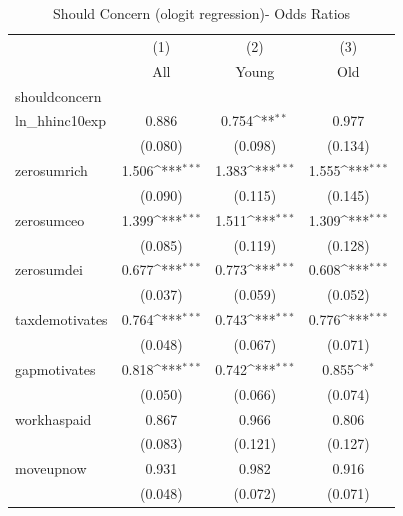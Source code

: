 \begin{table}[htbp]\centering
\def\sym#1{\ifmmode^{#1}\else\(^{#1}\)\fi}
\caption{Should Concern (ologit regression)- Odds Ratios}
\begin{tabular}{l*{3}{c}}
\toprule
            &\multicolumn{1}{c}{(1)}&\multicolumn{1}{c}{(2)}&\multicolumn{1}{c}{(3)}\\
            &\multicolumn{1}{c}{All}&\multicolumn{1}{c}{Young}&\multicolumn{1}{c}{Old}\\
\midrule
shouldconcern&                     &                     &                     \\
ln\_hhinc10exp&       0.886         &       0.754\sym{**} &       0.977         \\
            &     (0.080)         &     (0.098)         &     (0.134)         \\
\addlinespace
zerosumrich &       1.506\sym{***}&       1.383\sym{***}&       1.555\sym{***}\\
            &     (0.090)         &     (0.115)         &     (0.145)         \\
\addlinespace
zerosumceo  &       1.399\sym{***}&       1.511\sym{***}&       1.309\sym{***}\\
            &     (0.085)         &     (0.119)         &     (0.128)         \\
\addlinespace
zerosumdei  &       0.677\sym{***}&       0.773\sym{***}&       0.608\sym{***}\\
            &     (0.037)         &     (0.059)         &     (0.052)         \\
\addlinespace
taxdemotivates&       0.764\sym{***}&       0.743\sym{***}&       0.776\sym{***}\\
            &     (0.048)         &     (0.067)         &     (0.071)         \\
\addlinespace
gapmotivates&       0.818\sym{***}&       0.742\sym{***}&       0.855\sym{*}  \\
            &     (0.050)         &     (0.066)         &     (0.074)         \\
\addlinespace
workhaspaid &       0.867         &       0.966         &       0.806         \\
            &     (0.083)         &     (0.121)         &     (0.127)         \\
\addlinespace
moveupnow   &       0.931         &       0.982         &       0.916         \\
            &     (0.048)         &     (0.072)         &     (0.071)         \\

\end{tabular}
\end{table}
